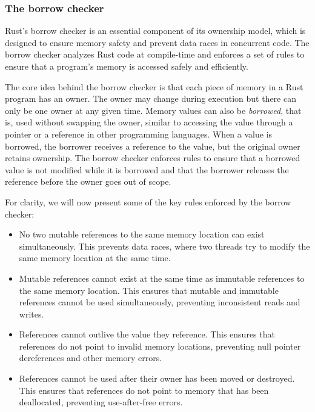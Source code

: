 \subsubsection{The borrow checker}

Rust's borrow checker is an essential component of its ownership model,
which is designed to ensure memory safety and prevent data races in concurrent code.
The borrow checker analyzes Rust code at compile-time
and enforces a set of rules to ensure that a program's memory is accessed safely and efficiently.

The core idea behind the borrow checker is that
each piece of memory in a Rust program has an owner.
The owner may change during execution but
there can only be one owner at any given time.
Memory values can also be \emph{borrowed}, that is,
used without swapping the owner,
similar to accessing the value through a pointer
or a reference in other programming languages.
When a value is borrowed, the borrower receives a reference to the value,
but the original owner retains ownership.
The borrow checker enforces rules to ensure that
a borrowed value is not modified while it is borrowed
and that the borrower releases the reference before the owner goes out of scope.

For clarity, we will now present some of the key rules enforced by the borrow checker:

\begin{itemize}
      \item No two mutable references to the same memory location can exist simultaneously.
            This prevents data races, where two threads
            try to modify the same memory location at the same time.
      \item Mutable references cannot exist at the same time
            as immutable references to the same memory location.
            This ensures that mutable and immutable references
            cannot be used simultaneously, preventing inconsistent reads and writes.
      \item References cannot outlive the value they reference.
            This ensures that references do not point to invalid memory locations,
            preventing null pointer dereferences and other memory errors.
      \item References cannot be used after their owner has been moved or destroyed.
            This ensures that references do not point to memory that has been deallocated,
            preventing use-after-free errors.
\end{itemize}

